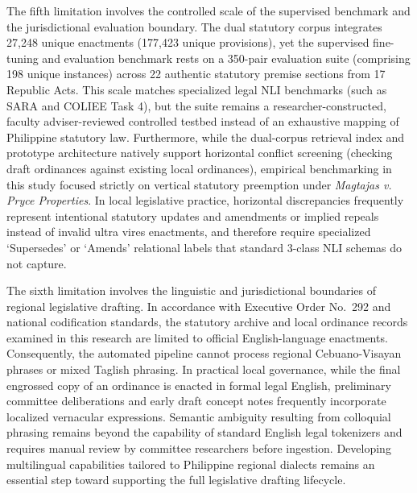 The fifth limitation involves the controlled scale of the supervised benchmark and the jurisdictional evaluation boundary. The dual statutory corpus integrates 27,248 unique enactments (177,423 unique provisions), yet the supervised fine-tuning and evaluation benchmark rests on a 350-pair evaluation suite (comprising 198 unique instances) across 22 authentic statutory premise sections from 17 Republic Acts. This scale matches specialized legal NLI benchmarks (such as SARA and COLIEE Task 4), but the suite remains a researcher-constructed, faculty adviser-reviewed controlled testbed instead of an exhaustive mapping of Philippine statutory law. Furthermore, while the dual-corpus retrieval index and prototype architecture natively support horizontal conflict screening (checking draft ordinances against existing local ordinances), empirical benchmarking in this study focused strictly on vertical statutory preemption under \textit{Magtajas v. Pryce Properties}. In local legislative practice, horizontal discrepancies frequently represent intentional statutory updates and amendments or implied repeals instead of invalid ultra vires enactments, and therefore require specialized `Supersedes' or `Amends' relational labels that standard 3-class NLI schemas do not capture.

The sixth limitation involves the linguistic and jurisdictional boundaries of regional legislative drafting. In accordance with Executive Order No.~292 and national codification standards, the statutory archive and local ordinance records examined in this research are limited to official English-language enactments. Consequently, the automated pipeline cannot process regional Cebuano-Visayan phrases or mixed Taglish phrasing. In practical local governance, while the final engrossed copy of an ordinance is enacted in formal legal English, preliminary committee deliberations and early draft concept notes frequently incorporate localized vernacular expressions. Semantic ambiguity resulting from colloquial phrasing remains beyond the capability of standard English legal tokenizers and requires manual review by committee researchers before ingestion. Developing multilingual capabilities tailored to Philippine regional dialects remains an essential step toward supporting the full legislative drafting lifecycle.

